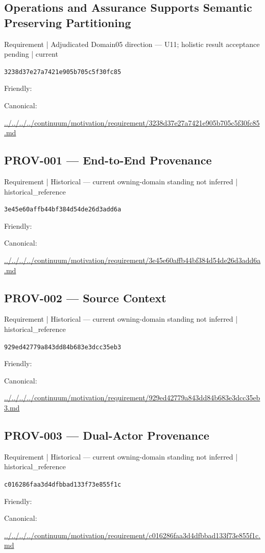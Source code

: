 \documentclass[10pt,a4paper]{article}
\begin{document}
\subsection*{Operations and Assurance Supports Semantic Preserving Partitioning}
{\small Requirement | Adjudicated Domain05 direction — U11; holistic result acceptance pending | current}\par
\texttt{3238d37e27a7421e905b705c5f30fc85}\par
Friendly: \par
Canonical: \par
{\footnotesize\url{../../../../continuum/motivation/requirement/3238d37e27a7421e905b705c5f30fc85.md}}\par
\subsection*{PROV-001 — End-to-End Provenance}
{\small Requirement | Historical — current owning-domain standing not inferred | historical\_reference}\par
\texttt{3e45e60affb44bf384d54de26d3add6a}\par
Friendly: \par
Canonical: \par
{\footnotesize\url{../../../../continuum/motivation/requirement/3e45e60affb44bf384d54de26d3add6a.md}}\par
\subsection*{PROV-002 — Source Context}
{\small Requirement | Historical — current owning-domain standing not inferred | historical\_reference}\par
\texttt{929ed42779a843dd84b683e3dcc35eb3}\par
Friendly: \par
Canonical: \par
{\footnotesize\url{../../../../continuum/motivation/requirement/929ed42779a843dd84b683e3dcc35eb3.md}}\par
\subsection*{PROV-003 — Dual-Actor Provenance}
{\small Requirement | Historical — current owning-domain standing not inferred | historical\_reference}\par
\texttt{c016286faa3d4dfbbad133f73e855f1c}\par
Friendly: \par
Canonical: \par
{\footnotesize\url{../../../../continuum/motivation/requirement/c016286faa3d4dfbbad133f73e855f1c.md}}\par
\end{document}
